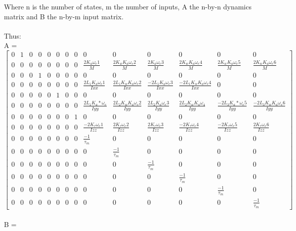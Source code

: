 \documentclass[12pt,a4paper,twoside]{report}
\begin{document}
					Where n is the number of states, m the number of inputs, A the n-by-n dynamics matrix and B the n-by-m input matrix.
					\\ \\
					Thus:
					\\
					\setcounter{MaxMatrixCols}{15}
					A = 
					\begin{equation}
					\begin{bmatrix}
						0&1&0&0&0&0&0&0&0&0&0&0&0&0\\
						0&0&0&0&0&0&0&0&\frac{2K_a\omega_e1}{M}&\frac{2K_wK_a\omega_e2}{M}&\frac{2K_a\omega_e3}{M}&\frac{2K_wK_a\omega_e4}{M}&\frac{2K_wK_a\omega_e5}{M}&\frac{2K_wK_a\omega_e6}{M}\\
						0&0&0&1&0&0&0&0&0&0&0&0&0&0\\
						0&0&0&0&0&0&0&0&\frac{2L_1K_a\omega_e1}{Ixx}&\frac{2L_1K_wK_a\omega_e2}{Ixx}& \frac{-2L_1K_a\omega_e3}{Ixx}&\frac{-2L_1K_wK_a\omega_e4}{Ixx}&0&0\\
						0&0&0&0&0&1&0&0&0&0&0&0&0&0\\
						0&0&0&0&0&0&0&0&\frac{2L_1K_a*\omega_e}{Iyy}&\frac{2L_2K_wK_a\omega_e2}{Iyy}& \frac{2L_2K_a\omega_e3}{Iyy}&\frac{2L_2K_wK_a\omega_4}{Iyy}&\frac{-2L_3K_a*\omega_e5}{Iyy}&\frac{-2L_3K_wK_a\omega_e6}{Iyy}\\
						0&0&0&0&0&0&0&1&0&0&0&0&0&0\\
						0&0&0&0&0&0&0&0&\frac{-2K_\tau\omega_e1}{Izz}&\frac{2K_\tau\omega_e2}{Izz}&\frac{2K_\tau\omega_e3}{Izz}&\frac{-2K_\tau\omega_e4}{Izz}&\frac{-2K_\tau\omega_e5}{Izz}&\frac{2K_\tau\omega_e6}{Izz}\\
						0&0&0&0&0&0&0&0&\frac{-1}{\tau_m}&0&0&0&0&0\\
						0&0&0&0&0&0&0&0&0&\frac{-1}{\tau_m}&0&0&0&0\\
						0&0&0&0&0&0&0&0&0&0&\frac{-1}{\tau_m}&0&0&0\\
						0&0&0&0&0&0&0&0&0&0&0&\frac{-1}{\tau_m}&0&0\\
						0&0&0&0&0&0&0&0&0&0&0&0&\frac{-1}{\tau_m}&0\\
						0&0&0&0&0&0&0&0&0&0&0&0&0&\frac{-1}{\tau_m}
					\end{bmatrix}
					\end{equation}
					\\
					B = 
\end{document}
